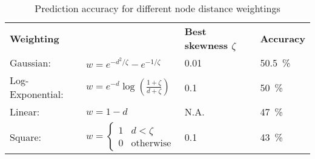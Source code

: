 \begin{table}[H]
\caption{Prediction accuracy for different node distance weightings}
\begin{center}
\begin{tabular}{l l l l}
\multicolumn{2}{l}{
\textbf{Weighting}}														& \textbf{Best skewness $\zeta$}		& \textbf{Accuracy}\\

Gaussian:			& $w=e^{-d^2/\zeta}-e^{-1/\zeta}$							& \SI{0.01}{}						&\SI{50.5}{\percent} \\

Log-Exponential:	& $w=e^{-d} \log\left( \frac{1+\zeta}{d+\zeta}\right)$				&\SI{0.1}{}							& \SI{50}{\percent} \\ 

Linear:			& $w=1-d$											& N.A. 							&\SI{47}{\percent} \\

Square:			&$w= \begin{cases}
1				&d < \zeta \\
0				& \text{otherwise}
				\end{cases}$											& \SI{0.1}{}						& \SI{43}{\percent}
\end{tabular}
\end{center}
\label{tab:Prediction accuracy for different node distance weightings}
\end{table}